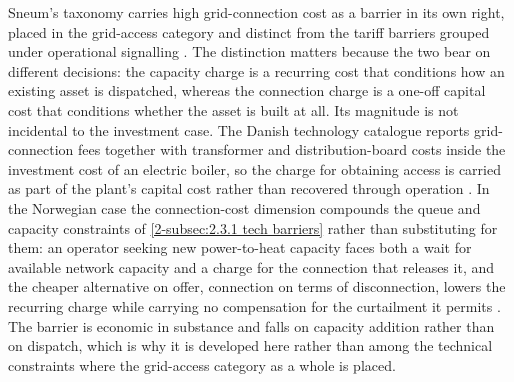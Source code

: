 Sneum's taxonomy carries high grid-connection cost as a barrier in its own right, placed in the grid-access category and distinct from the tariff barriers grouped under operational signalling \cite{sneum_barriers_2021}. The distinction matters because the two bear on different decisions: the capacity charge is a recurring cost that conditions how an existing asset is dispatched, whereas the connection charge is a one-off capital cost that conditions whether the asset is built at all. Its magnitude is not incidental to the investment case. The Danish technology catalogue reports grid-connection fees together with transformer and distribution-board costs inside the investment cost of an electric boiler, so the charge for obtaining access is carried as part of the plant's capital cost rather than recovered through operation \cite{danish_energy_agency_technology_2024}. In the Norwegian case the connection-cost dimension compounds the queue and capacity constraints of \autoref{2-subsec:2.3.1 tech barriers} rather than substituting for them: an operator seeking new power-to-heat capacity faces both a wait for available network capacity and a charge for the connection that releases it, and the cheaper alternative on offer, connection on terms of disconnection, lowers the recurring charge while carrying no compensation for the curtailment it permits \cite{energidepartementet_forskrift_2019}. The barrier is economic in substance and falls on capacity addition rather than on dispatch, which is why it is developed here rather than among the technical constraints where the grid-access category as a whole is placed.

